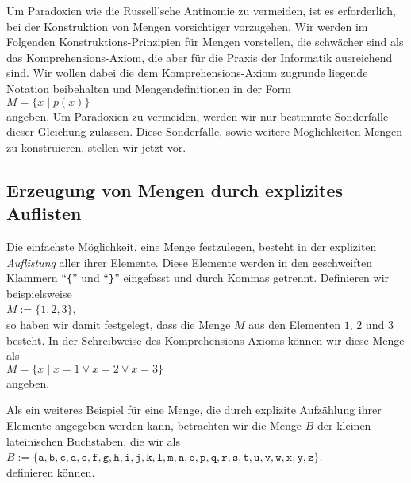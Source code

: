 Um  Paradoxien wie die Russell'sche Antinomie  zu vermeiden, ist es erforderlich, bei der
Konstruktion von Mengen vorsichtiger vorzugehen.
Wir werden im Folgenden Konstruktions-Prinzipien f\"{u}r Mengen vorstellen,
die schw\"{a}cher sind als das Komprehensions-Axiom, die aber f\"{u}r die Praxis der Informatik
ausreichend sind.  Wir wollen dabei die dem Komprehensions-Axiom zugrunde liegende Notation 
beibehalten und Mengendefinitionen in der Form \\[0.2cm]
\hspace*{1.3cm} $M = \{ x \mid p(x) \}$  \\[0.2cm]
angeben.  Um Paradoxien zu vermeiden, werden wir nur bestimmte
Sonderf\"{a}lle dieser Gleichung zulassen.  Diese Sonderf\"{a}lle, sowie weitere M\"{o}glichkeiten
Mengen zu konstruieren, stellen wir jetzt vor.

\subsection{Erzeugung von Mengen durch explizites Auflisten}
Die einfachste M\"{o}glichkeit, eine Menge festzulegen, besteht in der expliziten
\emph{Auflistung} aller ihrer Elemente. Diese Elemente werden in den geschweiften
Klammern ``\texttt{\{}'' und ``\texttt{\}}'' eingefasst und durch Kommas getrennt.
Definieren wir beispielsweise \\[0.2cm]
\hspace*{1.3cm} $M := \{ 1, 2, 3 \}$, \\[0.2cm]
so haben wir damit festgelegt, dass die Menge $M$ aus den Elementen $1$, $2$ und $3$
besteht. In der Schreibweise des Komprehensions-Axioms k\"{o}nnen wir diese Menge als \\[0.2cm]
\hspace*{1.3cm} $M = \{ x \mid x = 1 \vee x = 2 \vee x = 3 \}$ \\[0.2cm]
angeben.

Als ein weiteres Beispiel f\"{u}r eine Menge, die durch explizite Aufz\"{a}hlung ihrer Elemente
angegeben werden kann, betrachten wir die Menge $B$ der kleinen lateinischen Buchstaben, die wir als \\[0.2cm]
\hspace*{1.3cm} 
$B := \{\mathtt{a}, \mathtt{b}, \mathtt{c}, \mathtt{d}, \mathtt{e},
 \mathtt{f}, \mathtt{g}, \mathtt{h}, \mathtt{i}, \mathtt{j}, \mathtt{k}, \mathtt{l},
 \mathtt{m}, \mathtt{n}, \mathtt{o}, \mathtt{p}, \mathtt{q}, \mathtt{r}, \mathtt{s},
 \mathtt{t}, \mathtt{u}, \mathtt{v}, \mathtt{w}, \mathtt{x}, \mathtt{y}, \mathtt{z\}}$.
\\[0.2cm]
definieren k\"{o}nnen.

